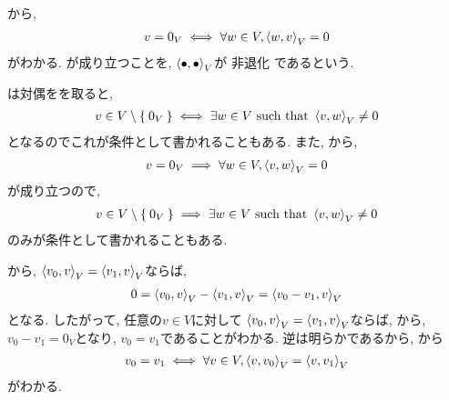 \begin{remark}
  から,
  \begin{align}
      v=0_V
      \iff
      \forall w\in V,\Braket{w,v}_V=0
      \label{def:inner:item:nondege:2}
  \end{align}
  がわかる.
  が成り立つことを,
  $\Braket{\bullet,\bullet}_V$が
  非退化
  であるという.

  は対偶をを取ると,
  \begin{align*}
    v\in V\setminus\Set{0_V}
    \iff
    \exists w\in V \text{ such that }
    \Braket{v,w}_V\neq 0
  \end{align*}
  となるのでこれが条件として書かれることもある.
  また,
  から,
  \begin{align*}
    v=0_V
    \implies
    \forall w\in V,\Braket{v,w}_V=0
  \end{align*}
  が成り立つので,
  \begin{align}
    v\in V\setminus\Set{0_V}
    \implies
    \exists w\in V \text{ such that }
    \Braket{v,w}_V\neq 0
    \label{def:inner:item:nondege:1x}
  \end{align}
  のみが条件として書かれることもある.


  
    から, $\Braket{v_0,v}_V= \Braket{v_1,v}_V$ならば,
  \begin{align*}
    0=\Braket{v_0,v}_V-\Braket{v_1,v}_V
    =\Braket{v_0-v_1,v}_V
  \end{align*}
  となる.
  したがって,
  任意の$v\in V$に対して
  $\Braket{v_0,v}_V= \Braket{v_1,v}_V$ならば,
  から,
  $v_0-v_1=0_V$となり, $v_0=v_1$であることがわかる.
  逆は明らかであるから,
  から
  \begin{align*}
    v_0=v_1\iff \forall v\in V, \Braket{v,v_0}_V= \Braket{v,v_1}_V
  \end{align*}
  がわかる.
\end{remark}
